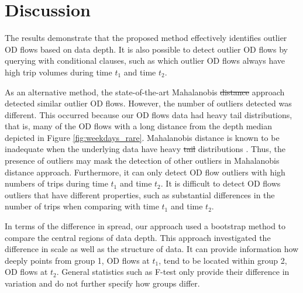 \documentclass[a4paper,UKenglish]{lipics-v2018}
\providecommand{\DIFadd}[1]{{\protect\color{blue}\uwave{#1}}} %
\providecommand{\DIFdel}[1]{{\protect\color{red}\sout{#1}}}                      %
\providecommand{\DIFaddbegin}{} %
\providecommand{\DIFaddend}{} %
\providecommand{\DIFdelbegin}{} %
\providecommand{\DIFdelend}{} %
\begin{document}
\DIFdelbegin %

\DIFdelend \section{Discussion}
\label{sec:discussion}
The results demonstrate that the proposed method effectively identifies outlier OD flows based on data depth.
It is also possible to detect outlier OD flows by querying with conditional clauses, such as which outlier OD flows always have high trip volumes during time $t_1$ and time $t_2$.

As an alternative method, the state-of-the-art Mahalanobis \DIFdelbegin \DIFdel{distance }\DIFdelend \DIFaddbegin \DIFadd{distance-based }\DIFaddend approach detected similar outlier OD flows.
However, the number of outliers detected was different.
This occurred because our OD flows data had heavy tail distributions, that is, many of the OD flows with a long distance from the depth median depicted in Figure \ref{fig:weekdays_rare}. 
Mahalanobis distance is known to be inadequate when the underlying data have heavy \DIFdelbegin \DIFdel{tail }\DIFdelend \DIFaddbegin \DIFadd{tailed }\DIFaddend distributions \cite{wilcox12Book}. 
Thus, the presence of outliers may mask the detection of other outliers in Mahalanobis distance approach.
Furthermore, it can only detect OD flow outliers with high numbers of trips during time $t_1$ and time $t_2$. 
It is difficult to detect OD flows outliers that have different properties, such as substantial differences in the number of trips when comparing with time $t_1$ and time $t_2$.

In terms of the difference in spread, our approach used a bootstrap method to compare the central regions of data depth.
This approach investigated the difference in scale as well as the structure of data.
It can provide information how deeply points from group 1, OD flows at $t_1$, tend to be located within group 2, OD flows at $t_2$.
General statistics such as F-test only provide their difference in variation and do not further specify how groups differ. 
\end{document}
